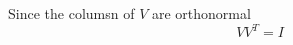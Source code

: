 \markdownRendererInterblockSeparator
{}Since the columsn of $V$ are orthonormal\markdownRendererEllipsis{}\markdownRendererInterblockSeparator
{}$$VV^T=I$$\relax